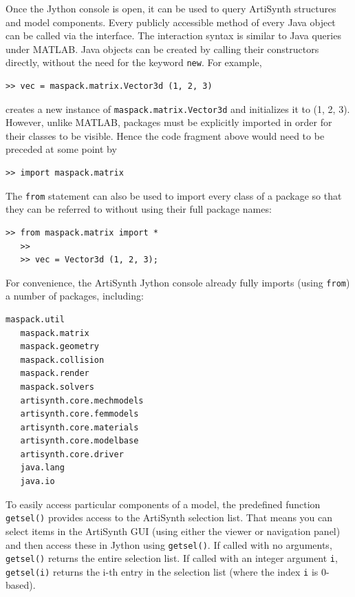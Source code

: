 \documentclass{article}
\begin{document}
Once the Jython console is open, it can be used to query ArtiSynth
structures and model components. Every publicly accessible method of
every Java object can be called via the interface.  The interaction
syntax is similar to Java queries under MATLAB.  Java
objects can be created by calling their constructors directly, without
the need for the keyword {\tt new}.  For example,
%
\begin{lstlisting}[]
   >> vec = maspack.matrix.Vector3d (1, 2, 3)
\end{lstlisting}
%
creates a new instance of {\tt maspack.matrix.Vector3d} and
initializes it to (1, 2, 3). However, unlike MATLAB, packages must be
explicitly imported in order for their classes to be visible.
Hence the code fragment above would need to be preceded 
at some point by
%
\begin{lstlisting}[]
   >> import maspack.matrix
\end{lstlisting}
%
The {\tt from} statement can also be used to import every class of a
package so that they can be referred to without using their full
package names:
%
\begin{lstlisting}[]
   >> from maspack.matrix import *
   >>
   >> vec = Vector3d (1, 2, 3);
\end{lstlisting}
%
For convenience, the ArtiSynth Jython console already fully imports
(using {\tt from}) a number of packages, including:
%
\begin{lstlisting}[]
   maspack.util
   maspack.matrix
   maspack.geometry
   maspack.collision
   maspack.render
   maspack.solvers
   artisynth.core.mechmodels
   artisynth.core.femmodels
   artisynth.core.materials
   artisynth.core.modelbase
   artisynth.core.driver
   java.lang
   java.io
\end{lstlisting}
%

To easily access particular components of a model, the predefined function
{\tt getsel()} provides access to the ArtiSynth selection
list. That means you can select items in the ArtiSynth GUI (using
either the viewer or navigation panel) and then access these in
Jython using {\tt getsel()}. If called with no arguments, {\tt
getsel()} returns the entire selection list.  If
called with an integer argument {\tt i}, {\tt getsel(i)} returns the
i-th entry in the selection list (where the index {\tt i} is 0-based).
\end{document}

